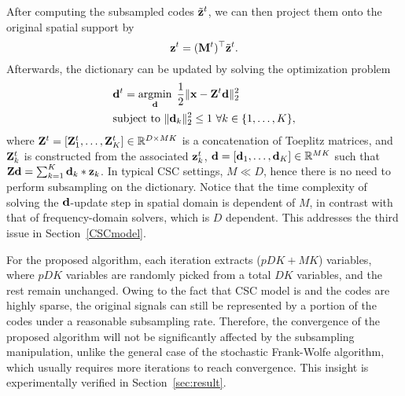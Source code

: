 After computing the subsampled codes $\subcode^\ite$, we can then project them
onto the original spatial support by
\begin{equation} \label{eq:upsampleCode}
    \code^\ite = (\mask^{\ite})^\top \subcode^\ite.
\end{equation}
Afterwards, the dictionary can be updated by solving the optimization problem
\begin{equation} \label{eq:updatingFilter}
\begin{split}
   & \filter^{\ite} = \minimize{\filter} \frac{1}{2}\|\signal - \Code^{\ite} \filter \|_2^2 \\
   & \text{subject to}  ~ \|\filter_k\|^2_2 \leq 1 ~ \forall k \in \{1,\dots,K\},
\end{split}
\end{equation}
where $\Code^{\ite}= [\Code_1^{\ite}, \dots, \Code_K^{\ite}]
\in \mathbb{R}^{D \times MK}$ is a concatenation of Toeplitz matrices,
and $\Code_k^{\ite}$ is constructed from the associated $\code_k^{\ite}$, $\filter=
[\filter_1,\dots,\filter_K] \in \mathbb{R}^{MK}$ such that $ \Code
\filter = \sum_{k=1}^{K} \filter_k * \code_k$. In typical CSC
settings, $M \ll D$, hence there is no need to perform subsampling on
the dictionary. Notice that the time complexity of solving the $\filter$-update 
step in spatial domain is dependent of $M$, in contrast with that of frequency-domain 
solvers, which is $D$ dependent. This addresses the third issue in Section~\ref{CSCmodel}.

 For the proposed algorithm, each iteration extracts
($pDK+MK$) variables, where $pDK$ variables are randomly picked from a
total $DK$ variables, and the rest remain unchanged. Owing to the fact
that CSC model is  and the codes are highly 
sparse, the original signals can still be represented by a portion of 
the codes under a reasonable subsampling
rate. Therefore, the convergence of the proposed algorithm will not be
significantly affected by the subsampling manipulation, unlike the
general case of the stochastic Frank-Wolfe algorithm, which usually
requires more iterations to reach convergence. This insight is
experimentally verified in Section~\ref{sec:result}.

